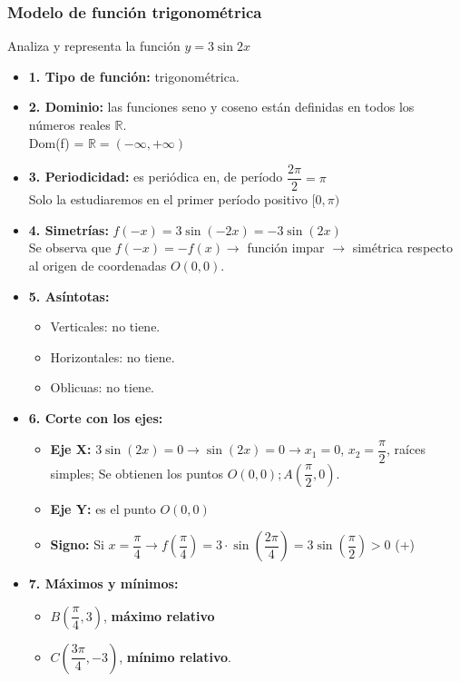 \subsubsection{Modelo de función trigonométrica}
Analiza y representa la función $y=3 \sin 2x$
\begin{itemize}
	\item \textbf{1. Tipo de función: }trigonométrica.
	\item \textbf{2. Dominio: }las funciones seno y coseno están definidas en todos los números reales $\mathbb{R}$.\\
	Dom(f) = $\mathbb{R}=(-\infty, +\infty)$
	\item \textbf{3. Periodicidad: }es periódica en, de período $\dfrac{2\pi}{2} = \pi$\\
	Solo la estudiaremos en el primer período positivo $[0, \pi)$
	\item \textbf{4. Simetrías: }$f(-x) = 3 \sin (-2x) = -3 \sin (2x)$\\
	Se observa que $f(-x)=-f(x) \rightarrow$ función impar $\rightarrow$ simétrica respecto al origen de coordenadas $O(0,0)$.
	\item \textbf{5. Asíntotas: }
	\begin{itemize}
		\item Verticales: no tiene.
		\item Horizontales: no tiene.
		\item Oblicuas: no tiene.
	\end{itemize}
	\item \textbf{6. Corte con los ejes: }
	\begin{itemize}
		\item \textbf{Eje X: }$3\sin(2x)=0 \rightarrow \sin(2x) = 0 \rightarrow x_1=0$, $x_2=\dfrac{\pi}{2}$, raíces simples; Se obtienen los puntos $O(0,0); A(\dfrac{\pi}{2}, 0)$.\\
		\item \textbf{Eje Y: }es el punto $O(0,0)$
		\item \textbf{Signo: }Si $x=\dfrac{\pi}{4} \rightarrow f(\dfrac{\pi}{4})=3\cdot \sin(\dfrac{2\pi}{4}) = 3 \sin(\dfrac{\pi}{2})>0$ (+)
	\end{itemize}
	\item \textbf{7. Máximos y mínimos: }\\
	\begin{itemize}
		\item $B(\dfrac{\pi}{4}, 3)$, \textbf{máximo relativo}
		\item $C(\dfrac{3\pi}{4}, -3)$, \textbf{mínimo relativo}.

\end{itemize}
\end{itemize}
